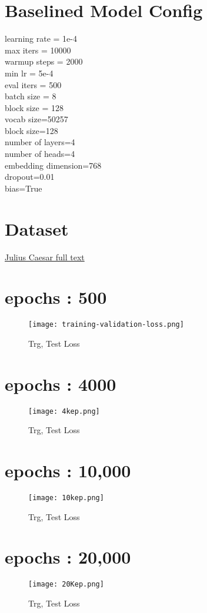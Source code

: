 \documentclass[conference]{IEEEtran}
\begin{document}
\section{Baselined Model Config}
learning rate = 1e-4 \\
max iters = 10000 \\
warmup steps = 2000 \\
min lr = 5e-4 \\
eval iters = 500 \\
batch size = 8 \\
block size = 128 \\
vocab size=50257 \\
block size=128 \\
number of layers=4 \\
number of heads=4 \\
embedding dimension=768 \\
dropout=0.01 \\
bias=True 

\section{Dataset}
\href{https://www.gutenberg.org/cache/epub/1522/pg1522.txt}{Julius Caesar full text}

\section{epochs : 500}

\begin{figure}[H]
    \centering
    \texttt{[image: training-validation-loss.png]}
    \caption{Trg, Test Loss}
    \label{fig:epoch500}
\end{figure}

\section{epochs : 4000}
\begin{figure}[H]
    \centering
    \texttt{[image: 4kep.png]}
    \caption{Trg, Test Loss}
    \label{fig:epoch4000}
\end{figure}

\section{epochs : 10,000}
\begin{figure}[H]
    \centering
    \texttt{[image: 10kep.png]}
    \caption{Trg, Test Loss}
    \label{fig:epoch10000}
\end{figure}

\section{epochs : 20,000}
\begin{figure}[H]
    \centering
    \texttt{[image: 20Kep.png]}
    \caption{Trg, Test Loss}
    \label{fig:epoch20000}
\end{figure}
\end{document}
